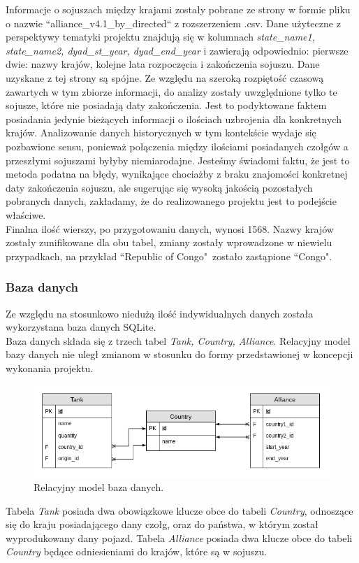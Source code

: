 \indent Informacje o sojuszach między krajami zostały pobrane ze strony\cite{alliance} w formie pliku o nazwie ``alliance\_v4.1\_by\_directed`` z rozszerzeniem .csv. Dane użyteczne z perspektywy tematyki projektu znajdują się w kolumnach \textit{state\_name1, state\_name2, dyad\_st\_year, dyad\_end\_year} i zawierają odpowiednio: pierwsze dwie: nazwy krajów, kolejne lata rozpoczęcia i zakończenia sojuszu. Dane uzyskane z tej strony są spójne. Ze względu na szeroką rozpiętość czasową zawartych w tym zbiorze informacji, do analizy zostały uwzględnione tylko te sojusze, które nie posiadają daty zakończenia. Jest to podyktowane faktem posiadania jedynie bieżących informacji o ilościach uzbrojenia dla konkretnych krajów. Analizowanie danych historycznych w tym kontekście wydaje się pozbawione sensu, ponieważ połączenia między ilościami posiadanych czołgów a przeszłymi sojuszami byłyby niemiarodajne. Jesteśmy świadomi faktu, że jest to metoda podatna na błędy, wynikające chociażby z braku znajomości konkretnej daty zakończenia sojuszu, ale sugerując się wysoką jakością pozostałych pobranych danych, zakładamy, że do realizowanego projektu jest to podejście właściwe.\\
Finalna ilość wierszy, po przygotowaniu danych, wynosi 1568.
Nazwy krajów zostały zunifikowane dla obu tabel, zmiany zostały wprowadzone w niewielu przypadkach, na przykład ``Republic of Congo"\ zostało zastąpione  ``Congo".

\subsubsection{Baza danych}
Ze względu na stosunkowo niedużą ilość indywidualnych danych została wykorzystana baza danych SQLite.\\
Baza danych składa się z trzech tabel \textit{Tank, Country, Alliance}.
Relacyjny model bazy danych nie uległ zmianom w stosunku do formy przedstawionej w koncepcji wykonania projektu.
\begin{figure}[H]
    \centering \includegraphics[width=0.8\linewidth]{tex/relacyjna_baza_danych.png}
    \caption{Relacyjny model baza danych.}
    \label{fig:rel_model}
\end{figure}
Tabela \textit{Tank} posiada dwa obowiązkowe klucze obce do tabeli \textit{Country}, odnoszące się do kraju posiadającego dany czołg, oraz do państwa, w którym został wyprodukowany dany pojazd.
Tabela \textit{Alliance} posiada dwa klucze obce do tabeli \textit{Country} będące odniesieniami do krajów, które są w sojuszu. 
